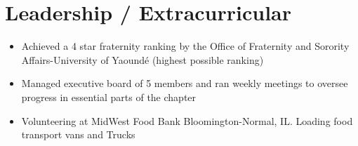 \documentclass[letterpaper,10pt]{article}
\newcommand{\resumeSubHeadingListStart}{\begin{itemize}[leftmargin=0.0in, label={}]}
\newcommand{\resumeSubHeadingListEnd}{\end{itemize}}
\begin{document}


\vspace{-1pt}   
\section{Leadership / Extracurricular}
     \begin{itemize}[leftmargin=*]
         \item Achieved a 4 star fraternity ranking by the Office of Fraternity and Sorority Affairs-University of Yaound\'e (highest possible ranking)\vspace{-7pt}
         \item Managed executive board of 5 members and ran weekly meetings to oversee progress in essential parts of the chapter\vspace{-7pt}
         \item Volunteering at MidWest Food Bank Bloomington-Normal, IL. Loading food transport vans and Trucks
     \end{itemize}
\end{document}
